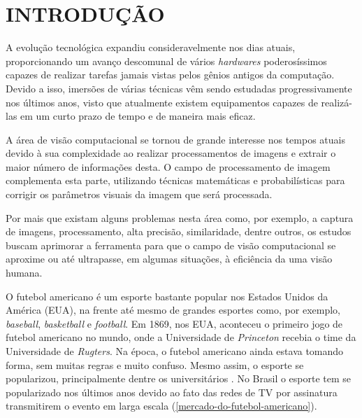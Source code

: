 \chapter{\textbf{INTRODUÇÃO}}
\label{cap-introducao}
A evolução tecnológica expandiu consideravelmente nos dias atuais, proporcionando um avanço descomunal de vários \textit{hardwares} poderosíssimos capazes de realizar tarefas jamais vistas pelos gênios antigos da computação. Devido a isso, imersões de várias técnicas vêm sendo estudadas progressivamente nos últimos anos, visto que atualmente existem equipamentos capazes de realizá-las em um curto prazo de tempo e de maneira mais eficaz.

A área de visão computacional se tornou de grande interesse nos tempos atuais devido à sua complexidade ao realizar processamentos de imagens e extrair o maior número de informações desta. O campo de processamento de imagem complementa esta parte, utilizando técnicas matemáticas e probabilísticas para corrigir os parâmetros visuais da imagem que será processada.

Por mais que existam alguns problemas nesta área como, por exemplo, a captura de imagens, processamento, alta precisão, similaridade, dentre outros, os estudos buscam aprimorar a ferramenta para que o campo de visão computacional se aproxime ou até ultrapasse, em algumas situações, à eficiência da uma visão humana.

O futebol americano é um esporte bastante popular nos Estados Unidos da América (EUA), na frente até mesmo de grandes esportes como, por exemplo, \textit{baseball}, \textit{basketball} e \textit{football}. Em 1869, nos EUA, aconteceu o primeiro jogo de futebol americano no mundo, onde a Universidade de \textit{Princeton} recebia o time da Universidade de \textit{Rugters}. Na época, o futebol americano ainda estava tomando forma, sem muitas regras e muito confuso. Mesmo assim, o esporte se popularizou, principalmente dentre os universitários \cite{RODRIGUES2014}. No Brasil o esporte tem se popularizado nos últimos anos devido ao fato das redes de TV por assinatura transmitirem o evento em larga escala (\autoref{mercado-do-futebol-americano}). 



